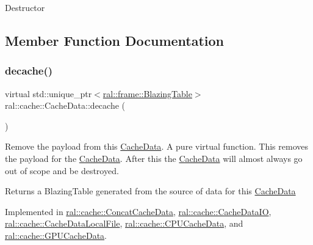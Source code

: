 Destructor 

\subsection{Member Function Documentation}
\mbox{\label{classral_1_1cache_1_1CacheData_a2db8fdd2151babd7a07f4c6e246b710c}} 
\subsubsection{\texorpdfstring{decache()}{decache()}}
{\footnotesize\ttfamily virtual std\+::unique\+\_\+ptr$<$\hyperlink{classral_1_1frame_1_1BlazingTable}{ral\+::frame\+::\+Blazing\+Table}$>$ ral\+::cache\+::\+Cache\+Data\+::decache (\begin{DoxyParamCaption}{ }\end{DoxyParamCaption})\hspace{0.3cm}{\ttfamily [pure virtual]}}

Remove the payload from this \hyperlink{classral_1_1cache_1_1CacheData}{Cache\+Data}. A pure virtual function. This removes the payload for the \hyperlink{classral_1_1cache_1_1CacheData}{Cache\+Data}. After this the \hyperlink{classral_1_1cache_1_1CacheData}{Cache\+Data} will almost always go out of scope and be destroyed. \begin{DoxyReturn}{Returns}
a Blazing\+Table generated from the source of data for this \hyperlink{classral_1_1cache_1_1CacheData}{Cache\+Data} 
\end{DoxyReturn}


Implemented in \hyperlink{classral_1_1cache_1_1ConcatCacheData_af726fc27fcf1621fff1f399f8b2d3cec}{ral\+::cache\+::\+Concat\+Cache\+Data}, \hyperlink{classral_1_1cache_1_1CacheDataIO_a7fb2dceef20a385e31508ac70edfbf58}{ral\+::cache\+::\+Cache\+Data\+IO}, \hyperlink{classral_1_1cache_1_1CacheDataLocalFile_a1d34227fbbf671e47119846ee2f2a0af}{ral\+::cache\+::\+Cache\+Data\+Local\+File}, \hyperlink{classral_1_1cache_1_1CPUCacheData_a03a18d3dfd4fe60dffdd0a9daabfbde2}{ral\+::cache\+::\+C\+P\+U\+Cache\+Data}, and \hyperlink{classral_1_1cache_1_1GPUCacheData_a7efe1d821067ba5266df18adb701bf5f}{ral\+::cache\+::\+G\+P\+U\+Cache\+Data}.

\mbox{\label{classral_1_1cache_1_1CacheData_af70878c08fae1935cd0a39999cabf6fb}} 
